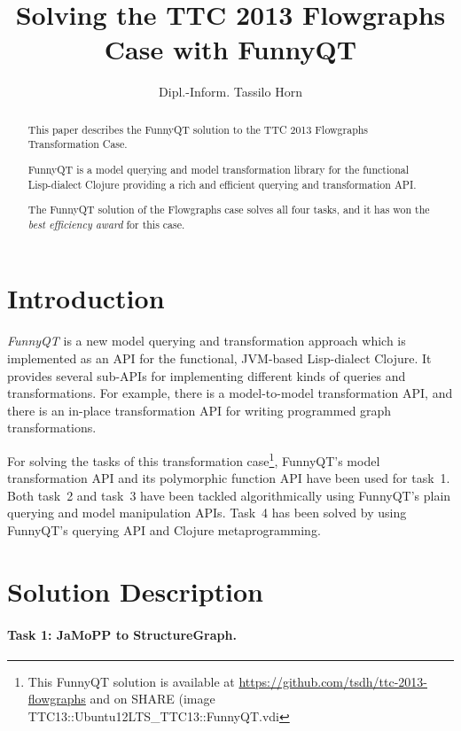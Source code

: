 \documentclass[submission]{eptcs}
\title{Solving the TTC 2013 Flowgraphs Case with FunnyQT}
\author{Dipl.-Inform. Tassilo Horn
  \email{horn@uni-koblenz.de}
  \institute{Institute for Software Technology, University Koblenz-Landau, Germany}}
\begin{document}
\maketitle

\begin{abstract}
  This paper describes the FunnyQT solution to the TTC 2013 Flowgraphs
  Transformation Case.

  FunnyQT is a model querying and model transformation library for the
  functional Lisp-dialect Clojure providing a rich and efficient querying and
  transformation API.

  The FunnyQT solution of the Flowgraphs case solves all four tasks, and it has
  won the \emph{best efficiency award} for this case.
\end{abstract}

\section{Introduction}
\label{sec:introduction}

\emph{FunnyQT} is a new model querying and transformation approach which is
implemented as an API for the functional, JVM-based Lisp-dialect Clojure.  It
provides several sub-APIs for implementing different kinds of queries and
transformations.  For example, there is a model-to-model transformation API,
and there is an in-place transformation API for writing programmed graph
transformations.

For solving the tasks of this transformation case\footnote{This FunnyQT
  solution is available at \url{https://github.com/tsdh/ttc-2013-flowgraphs}
  and on SHARE (image \textsf{TTC13::Ubuntu12LTS\_TTC13::FunnyQT.vdi}},
FunnyQT's model transformation API and its polymorphic function API have been
used for task~1.  Both task~2 and task~3 have been tackled algorithmically
using FunnyQT's plain querying and model manipulation APIs.  Task~4 has been
solved by using FunnyQT's querying API and Clojure metaprogramming.

\section{Solution Description}
\label{sec:solution-description}


\paragraph{Task 1: JaMoPP to StructureGraph.}
\label{sec:task-1}
\end{document}

